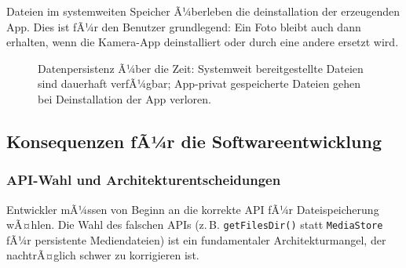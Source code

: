 ﻿\documentclass[12pt, a4paper]{article}
\begin{document}
Dateien im systemweiten Speicher Ã¼berleben die deinstallation der erzeugenden App.
Dies ist fÃ¼r den Benutzer grundlegend: Ein Foto bleibt auch dann erhalten, wenn
die Kamera-App deinstalliert oder durch eine andere ersetzt wird.

\begin{figure}[ht]
\centering
{}
\caption{Datenpersistenz Ã¼ber die Zeit: Systemweit bereitgestellte Dateien sind dauerhaft
verfÃ¼gbar; App-privat gespeicherte Dateien gehen bei Deinstallation der App verloren.}
\label{fig:persistenz}
\end{figure}

\subsection{Konsequenzen fÃ¼r die Softwareentwicklung}

\subsubsection{API-Wahl und Architekturentscheidungen}

Entwickler mÃ¼ssen von Beginn an die korrekte API fÃ¼r Dateispeicherung wÃ¤hlen.
Die Wahl des falschen APIs (z.\,B. \texttt{getFilesDir()} statt \texttt{MediaStore}
fÃ¼r persistente Mediendateien) ist ein fundamentaler Architekturmangel, der
nachtrÃ¤glich schwer zu korrigieren ist.
\end{document}
